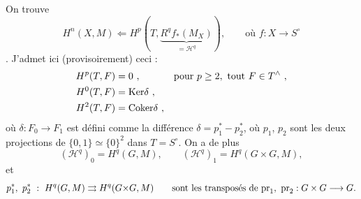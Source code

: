 On trouve
\[
H^n(X,M) \Longleftarrow H^p(T, \underbrace{R^q f_*(M_X)}_{= \mathcal{H}^q}), \qquad \text{où } f : X \longrightarrow S^\circ
\]
. J'admet ici (provisoirement) ceci : %
\[
\begin{aligned}
H^p(T,F) &= 0 \ , &&\text{pour } p\geq 2, \text{ tout } F\in T^\wedge \ ,\\
H^0(T,F) &= \Ker\delta \ , &&\\
H^2(T,F) &= \Coker\delta \ , && %
\end{aligned}
\]
où $\delta : F_0 \longrightarrow F_1$ est défini comme la différence $\delta = p_1^* - p_2^*$, où $p_1$, $p_2$ sont les deux projections de $\{0,1\}\simeq\{0\}^2$ dans $T = S^\circ$. On a de plus
\[
(\mathcal{H}^q)_0 = H^q(G,M), \qquad (\mathcal{H}^q)_1 = H^q(G\times G, M),
\]
et
\[
p_1^*,\ p_2^*\ :\ H^q(G,M) \rightrightarrows H^q(G{\times}G, M) \qquad \text{sont les transposés de } \mathrm{pr}_1,\ \mathrm{pr}_2 : G\times G\longrightarrow G.
\]

